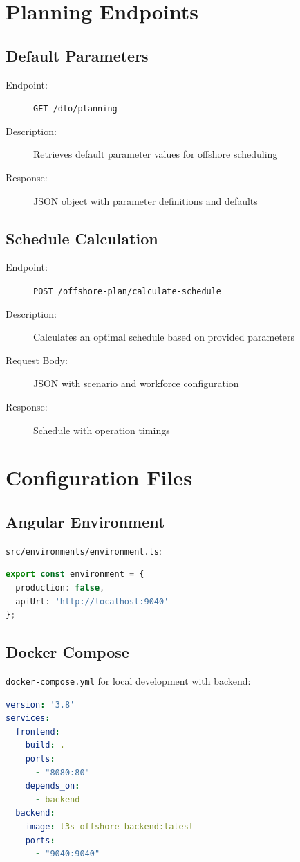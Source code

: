 \section{Planning Endpoints}
\label{sec:planning-endpoints}

\subsection{Default Parameters}

\begin{description}
    \item[Endpoint:] \texttt{GET /dto/planning}
    \item[Description:] Retrieves default parameter values for offshore scheduling
    \item[Response:] JSON object with parameter definitions and defaults
\end{description}

\subsection{Schedule Calculation}

\begin{description}
    \item[Endpoint:] \texttt{POST /offshore-plan/calculate-schedule}
    \item[Description:] Calculates an optimal schedule based on provided parameters
    \item[Request Body:] JSON with scenario and workforce configuration
    \item[Response:] Schedule with operation timings
\end{description}

\section{Configuration Files}
\label{sec:config-files}

\subsection{Angular Environment}

\texttt{src/environments/environment.ts}:

\begin{lstlisting}[language=TypeScript, caption={Development environment configuration}]
export const environment = {
  production: false,
  apiUrl: 'http://localhost:9040'
};
\end{lstlisting}

\subsection{Docker Compose}

\texttt{docker-compose.yml} for local development with backend:

\begin{lstlisting}[language=yaml, caption={Docker Compose configuration}]
version: '3.8'
services:
  frontend:
    build: .
    ports:
      - "8080:80"
    depends_on:
      - backend
  backend:
    image: l3s-offshore-backend:latest
    ports:
      - "9040:9040"
\end{lstlisting}
